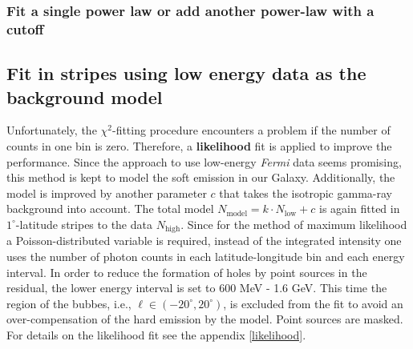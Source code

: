 \documentclass[a4paper]{article}
\begin{document}
\subsubsection{Fit a single power law or add another power-law with a cutoff}

\subsection{Fit in stripes using low energy data as the background model} 
Unfortunately, the $\chi^2$-fitting procedure encounters a problem if the number of counts in one bin is zero. Therefore, a \textbf{likelihood} fit is applied to improve the performance. Since the approach to use low-energy \textit{Fermi} data seems promising, this method is kept to model the soft emission in our Galaxy. Additionally, the model is improved by another parameter $c$ that takes the isotropic gamma-ray background into account. The total model $N_{\text{model}} = k \cdot N_{\text{low}} + c$ is again fitted in $1^\circ$-latitude stripes to the data $N_{\text{high}}$. Since for the method of maximum likelihood a Poisson-distributed variable is required, instead of the integrated intensity one uses the number of photon counts in each latitude-longitude bin and each energy interval. In order to reduce the formation of holes by point sources in the residual, the lower energy interval is set to 600 MeV - 1.6 GeV. This time the region of the bubbes, i.e., $\ell \in (-20^\circ,20^\circ)$, is excluded from the fit to avoid an over-compensation of the hard emission by the model. Point sources are masked. For details on the likelihood fit see the appendix \ref{likelihood}.\\
\end{document}
